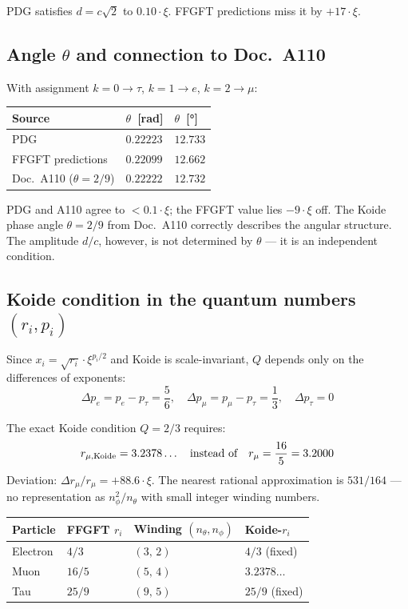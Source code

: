 PDG satisfies $d = c\sqrt{2}$ to $0.10\cdot\xi$. FFGFT predictions miss it by
$+17\cdot\xi$.

\subsection*{Angle $\theta$ and connection to Doc.~A110}

With assignment $k=0\to\tau$, $k=1\to e$, $k=2\to\mu$:

\begin{center}
\begin{tabular}{@{}lll@{}}
\toprule
Source & $\theta$~[rad] & $\theta$~[°] \\
\midrule
PDG & $0.22223$ & $12.733$ \\
FFGFT predictions & $0.22099$ & $12.662$ \\
Doc.~A110 ($\theta = 2/9$) & $0.22222$ & $12.732$ \\
\bottomrule
\end{tabular}
\end{center}

PDG and A110 agree to $< 0.1\cdot\xi$; the FFGFT value lies $-9\cdot\xi$ off.
The Koide phase angle $\theta = 2/9$
from Doc.~A110 correctly describes the angular structure. The amplitude $d/c$,
however, is not determined by $\theta$ --- it is an independent condition.

\subsection*{Koide condition in the quantum numbers $(r_i, p_i)$}

Since $x_i = \sqrt{r_i}\cdot\xi^{p_i/2}$ and Koide is scale-invariant, $Q$ depends
only on the differences of exponents:
\begin{equation}
  \Delta p_e = p_e - p_\tau = \frac{5}{6},\quad
  \Delta p_\mu = p_\mu - p_\tau = \frac{1}{3},\quad
  \Delta p_\tau = 0
\end{equation}

The exact Koide condition $Q = 2/3$ requires:
\begin{equation}
  r_{\mu,{\rm Koide}} = 3.2378\ldots \quad\text{instead of}\quad r_\mu = \frac{16}{5} = 3.2000
\end{equation}
Deviation: $\Delta r_\mu / r_\mu = +88.6\cdot\xi$. The nearest rational approximation
is $531/164$ --- no representation as $n_\phi^2/n_\theta$ with small integer winding numbers.

\begin{center}
\begin{tabular}{@{}llll@{}}
\toprule
Particle & FFGFT $r_i$ & Winding $(n_\theta, n_\phi)$ & Koide-$r_i$ \\
\midrule
Electron & $4/3$ & $(3,\,2)$ & $4/3$ (fixed) \\
Muon & $16/5$ & $(5,\,4)$ & $3.2378\ldots$ \\
Tau & $25/9$ & $(9,\,5)$ & $25/9$ (fixed) \\
\bottomrule
\end{tabular}
\end{center}

